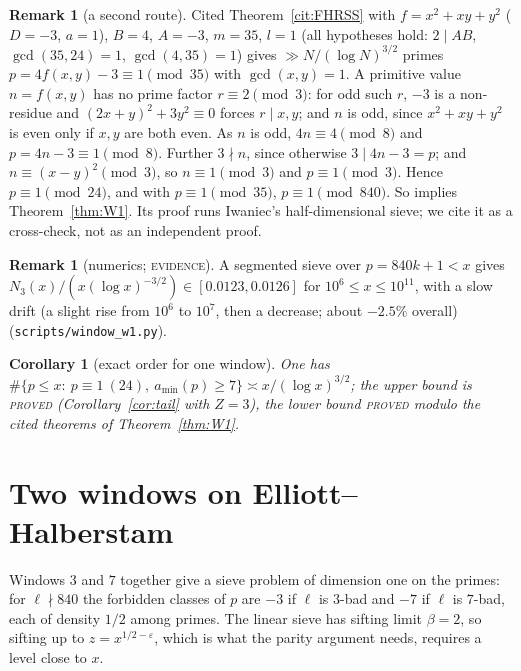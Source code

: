 \documentclass[11pt,reqno]{amsart}
\newtheorem{corollary}[theorem]{Corollary}
\theoremstyle{definition}
\newtheorem{remark}[theorem]{Remark}
\newcommand{\amin}{a_{\min}}
\newcommand{\status}[1]{\textup{\textsc{#1}}}
\begin{document}
\begin{remark}[a second route]\label{rem:FHRSS}
Cited Theorem~\ref{cit:FHRSS} with $f=x^2+xy+y^2$ ($D=-3$, $a=1$), $B=4$,
$A=-3$, $m=35$, $l=1$ (all hypotheses hold: $2\mid AB$, $\gcd(35,24)=1$,
$\gcd(4,35)=1$) gives $\gg N/(\log N)^{3/2}$ primes $p=4f(x,y)-3\equiv1\pmod{35}$
with $\gcd(x,y)=1$.  A primitive value $n=f(x,y)$ has no prime factor
$r\equiv2\pmod3$: for odd such $r$, $-3$ is a non-residue and
$(2x+y)^2+3y^2\equiv0$ forces $r\mid x,y$; and $n$ is odd, since
$x^2+xy+y^2$ is even only if $x,y$ are both even.  As $n$ is odd,
$4n\equiv4\pmod8$ and $p=4n-3\equiv1\pmod8$.  Further $3\nmid n$, since
otherwise $3\mid4n-3=p$; and $n\equiv(x-y)^2\pmod3$, so $n\equiv1\pmod3$
and $p\equiv1\pmod3$.  Hence $p\equiv1\pmod{24}$, and with
$p\equiv1\pmod{35}$, $p\equiv1\pmod{840}$.  So
\cite[Thm.~1.1(2)]{FHRSS} implies Theorem~\ref{thm:W1}.  Its proof runs
Iwaniec's half-dimensional sieve; we cite it as a cross-check, not as an
independent proof.
\end{remark}

\begin{remark}[numerics; \status{evidence}]\label{rem:W1num}
A segmented sieve over $p=840k+1<x$ gives
$N_3(x)/(x(\log x)^{-3/2})\in[0.0123,0.0126]$ for $10^6\le x\le10^{11}$,
with a slow drift (a slight rise from $10^6$ to $10^7$, then a decrease;
about $-2.5\%$ overall)
(\texttt{scripts/window\_w1.py}).
\end{remark}

\begin{corollary}[exact order for one window]\label{cor:orders1}
One has
$\#\{p\le x:\ p\equiv1\ (24),\ \amin(p)\ge7\}\asymp x/(\log x)^{3/2}$; the
upper bound is \status{proved} (Corollary~\ref{cor:tail} with $Z=3$), the lower
bound \status{proved} modulo the cited theorems of Theorem~\ref{thm:W1}.
\end{corollary}

\section{Two windows on Elliott--Halberstam}\label{sec:W2}

Windows $3$ and $7$ together give a sieve problem of dimension one on the
primes: for $\ell\nmid840$ the forbidden classes of $p$ are $-3$ if $\ell$ is
$3$-bad and $-7$ if $\ell$ is $7$-bad, each of density $1/2$ among primes.
The linear sieve has sifting limit $\beta=2$, so sifting up to
$z=x^{1/2-\varepsilon}$, which is what the parity argument needs, requires
a level close to $x$.
\end{document}
